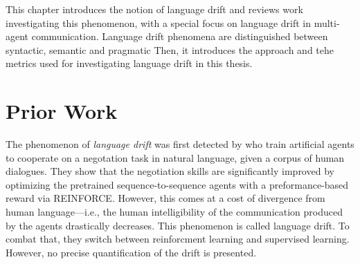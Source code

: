 This chapter introduces the notion of language drift and reviews work investigating this phenomenon, with a special focus on language drift in multi-agent communication. Language drift phenomena are distinguished between syntactic, semantic and pragmatic  Then, it introduces the approach and tehe metrics used for investigating language drift in this thesis.  

\section{Prior Work}

The phenomenon of \textit{language drift} was first detected by \cite{lewis2017deal} who train artificial agents to cooperate on a negotation task in natural language, given a corpus of human dialogues. They show that the negotiation skills are significantly improved by optimizing the pretrained sequence-to-sequence agents with a preformance-based reward via REINFORCE. However, this comes at a cost of divergence from human language---i.e., the human intelligibility of the communication produced by the agents drastically decreases. This phenomenon is called language drift. To combat that, they switch between reinforcment learning and supervised learning. However, no precise quantification of the drift is presented. 

